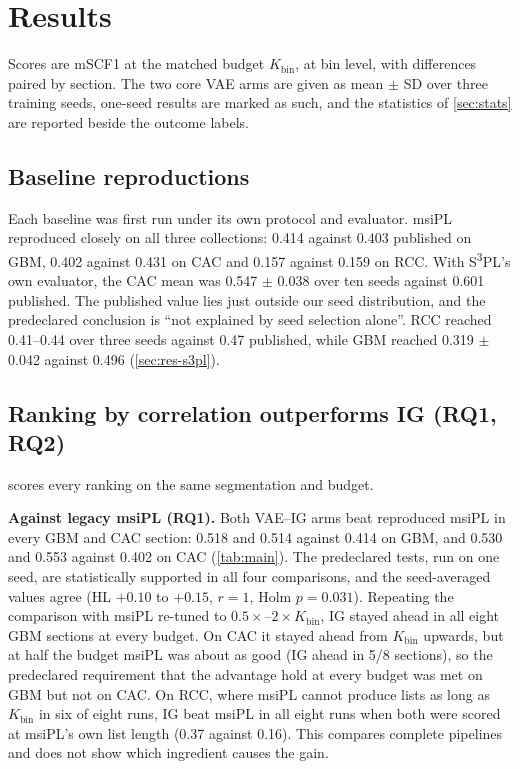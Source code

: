 \section{Results}
\label{sec:results}

Scores are mSCF1 at the matched budget $K_{\text{bin}}$, at bin level, with
differences paired by section. The two core VAE arms are given as
mean $\pm$ SD over three training seeds, one-seed results are marked as such, and the statistics of
\cref{sec:stats} are reported beside the outcome labels.

\subsection{Baseline reproductions}
\label{sec:res-repro}
Each baseline was first run under its own protocol and evaluator. msiPL
reproduced closely on all three collections: 0.414 against 0.403 published on
GBM, 0.402 against 0.431 on CAC and 0.157 against 0.159 on RCC.
With S\textsuperscript{3}PL's own evaluator, the CAC mean was 0.547
$\pm$ 0.038 over ten seeds against 0.601 published. The published value lies
just outside our seed distribution, and the predeclared conclusion is ``not
explained by seed selection alone''.
RCC reached 0.41--0.44 over three seeds against 0.47 published, while GBM
reached 0.319 $\pm$ 0.042 against 0.496 (\cref{sec:res-s3pl}).

\subsection{Ranking by correlation outperforms IG (RQ1, RQ2)}
\label{sec:res-main}
 scores every ranking on the same segmentation and budget.

\textbf{Against legacy msiPL (RQ1).} Both VAE--IG arms beat reproduced msiPL in
every GBM and CAC section: 0.518 and 0.514 against 0.414 on GBM, and 0.530 and
0.553 against 0.402 on CAC (\cref{tab:main}). The predeclared tests, run on
one seed, are statistically supported in all four comparisons, and the
seed-averaged values agree (HL $+0.10$ to $+0.15$, $r=1$, Holm $p=0.031$).
Repeating the comparison with msiPL re-tuned to $0.5\times$--$2\times
K_{\text{bin}}$, IG stayed ahead in all eight GBM sections at every budget.
On CAC it stayed ahead from $K_{\text{bin}}$ upwards, but at half the budget msiPL
was about as good (IG ahead in 5/8 sections), so the predeclared requirement
that the advantage hold at every budget was met on GBM but not on CAC.
On RCC, where msiPL cannot produce lists as long as $K_{\text{bin}}$ in six of
eight runs, IG beat msiPL in all eight runs when both were scored at msiPL's
own list length (0.37 against 0.16).
This compares complete pipelines and does not show which ingredient causes the
gain.

